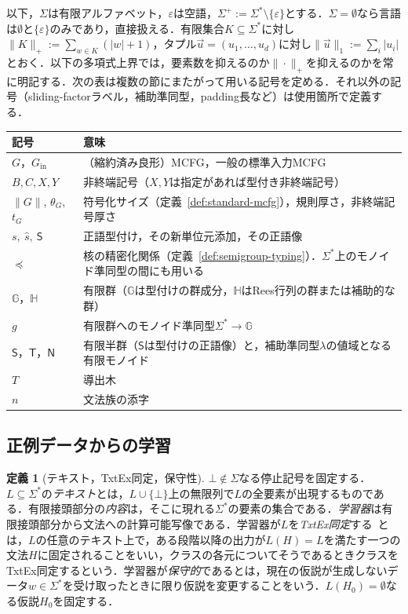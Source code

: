 \documentclass[11pt,a4paper]{ltjsarticle}
\numberwithin{equation}{section}
\theoremstyle{plain}
\theoremstyle{definition}
\newtheorem{definition}[theorem]{定義}
\theoremstyle{remark}
\newcommand{\tuple}[1]{\vec{#1}}
\newcommand{\eps}{\varepsilon}
\newcommand{\pausesym}{\bot}
\begin{document}
以下，$\Sigma$は有限アルファベット，$\eps$は空語，$\Sigma^+:=\Sigma^*\setminus\{\eps\}$とする．$\Sigma=\emptyset$なら言語は$\emptyset$と$\{\eps\}$のみであり，直接扱える．有限集合$K\subseteq\Sigma^*$に対し$\|K\|_+:=\sum_{w\in K}(|w|+1)$，タプル$\tuple u=(u_1,\ldots,u_d)$に対し$\|\tuple u\|_1:=\sum_i|u_i|$とおく．以下の多項式上界では，要素数を抑えるのか$\|\cdot\|_+$を抑えるのかを常に明記する．次の表は複数の節にまたがって用いる記号を定める．それ以外の記号（sliding-factorラベル，補助準同型，padding長など）は使用箇所で定義する．
\begin{center}
\footnotesize
\renewcommand{\arraystretch}{1.12}
\begin{tabularx}{\linewidth}{@{}lX@{}}
\hline
記号 & 意味\\
\hline
$G$，$G_{\mathrm{in}}$ & （縮約済み良形）MCFG，一般の標準入力MCFG\\
$B,C,X,Y$ & 非終端記号（$X,Y$は指定があれば型付き非終端記号）\\
$\|G\|$, $\theta_G$, $t_G$ & 符号化サイズ（定義~\ref{def:standard-mcfg}），規則厚さ，非終端記号厚さ\\
$s,\ \widehat s,\ \mathsf S$ & 正語型付け，その新単位元添加，その正語像\\
$\preceq$ & 核の精密化関係（定義~\ref{def:semigroup-typing}）．$\Sigma^*$上のモノイド準同型の間にも用いる\\
$\mathbb G$，$\mathbb H$ & 有限群（$\mathbb G$は型付けの群成分，$\mathbb H$はRees行列の群または補助的な群）\\
$g$ & 有限群へのモノイド準同型$\Sigma^*\to\mathbb G$\\
$\mathsf S$，$\mathsf T$，$\mathsf N$ & 有限半群（$\mathsf S$は型付けの正語像）と，補助準同型$\lambda$の値域となる有限モノイド\\
$T$ & 導出木\\
$n$ & 文法族の添字\\
\hline
\end{tabularx}
\end{center}

\subsection{正例データからの学習}

\begin{definition}[テキスト，TxtEx同定，保守性]
$\pausesym\notin\Sigma$なる停止記号を固定する．$L\subseteq\Sigma^*$の\emph{テキスト}とは，$L\cup\{\pausesym\}$上の無限列で$L$の全要素が出現するものである．有限接頭部分の\emph{内容}は，そこに現れる$\Sigma^*$の要素の集合である．\emph{学習器}は有限接頭部分から文法への計算可能写像である．学習器が$L$を\emph{TxtEx同定}する~\cite{Gold1967}とは，$L$の任意のテキスト上で，ある段階以降の出力が$L(H)=L$を満たす一つの文法$H$に固定されることをいい，クラスの各元についてそうであるときクラスをTxtEx同定するという．学習器が\emph{保守的}であるとは，現在の仮説が生成しないデータ$w\in\Sigma^*$を受け取ったときに限り仮説を変更することをいう．$L(H_0)=\emptyset$なる仮説$H_0$を固定する．
\end{definition}
\end{document}
